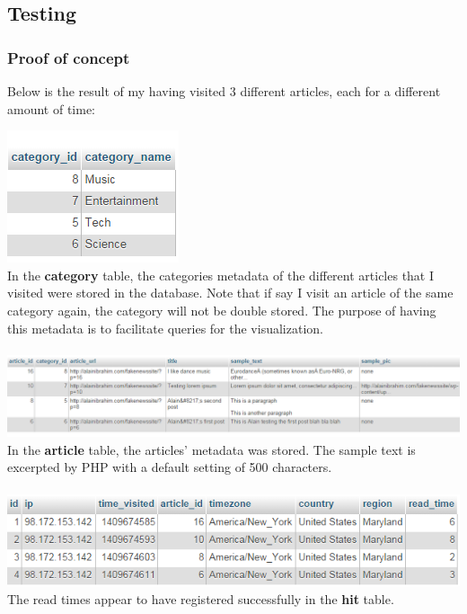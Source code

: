 \documentclass[12pt]{article}
\begin{document}
\subsection{Testing}
\subsubsection{Proof of concept}
Below is the result of my having visited 3 different articles, each for a different amount of time:

\noindent\includegraphics[scale=1]{img/results_categories} \\
\noindent In the \textbf{category} table, the categories metadata of the different articles that I visited were stored in the database. Note that if say I visit an article of the same category again, the category will not be double stored. The purpose of having this metadata is to facilitate queries for the visualization. \\ \\

\noindent\includegraphics[scale=0.6]{img/results_articles}
\noindent In the \textbf{article} table, the articles' metadata was stored. The sample text is excerpted by PHP with a default setting of 500 characters. \\ \\ 

\noindent\includegraphics[scale=1]{img/results_hits} \\
\noindent The read times appear to have registered successfully in the \textbf{hit} table. \\
\end{document}

